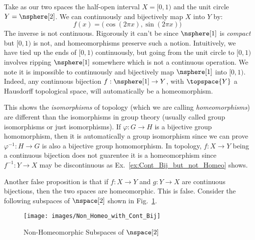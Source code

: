         \begin{example}
            \label{ex:Cont_Bij_but_not_Homeo}%
            Take as our two spaces the half-open interval $X=[0,1)$ and
            the unit circle $Y=\nsphere[2]$. We can continuously and
            bijectively map $X$ into $Y$ by:
            \begin{equation}
                f(x)=\big(\cos(2\pi{x}),\sin(2\pi{x})\big)
            \end{equation}
            The inverse is not continuous. Rigorously it can't be
            since $\nsphere[1]$ is \textit{compact} but $[0,1)$ is not,
            and homeomorphisms preserve such a notion. Intuitively, we
            have tied up the ends of $[0,1)$ continuously, but going
            from the unit circle to $[0,1)$ involves ripping $\nsphere[1]$
            somewhere which is not a continuous operation. We note it
            is impossible to continuously and bijectively map $\nsphere[1]$
            into $[0,1)$. Indeed, any continuous bijection
            $f:\nsphere[1]\rightarrow{Y}$, with $\topspace{Y}$ a
            Hausdorff topological space, will automatically be a
            homeomorphism.
        \end{example}
        This shows the \textit{isomorphisms} of topology (which we are
        calling \textit{homeomorphisms}) are different than the
        isomorphisms in group theory (usually called group isomorphisms
        or just isomorphisms). If $\varphi:G\rightarrow{H}$ is a bijective
        group homomorphism, then it is automatically a group isomorphism
        since we can prove $\varphi^{\minus{1}}:H\rightarrow{G}$ is also
        a bijective group homomorphism. In topology, $f:X\rightarrow{Y}$
        being a continuous bijection does not guarentee it is a
        homeomorphism since $f^{\minus{1}}:Y\rightarrow{X}$ may be
        discontinuous as Ex.~\ref{ex:Cont_Bij_but_not_Homeo} shows.
        \par\hfill\par
        Another false proposition is that if $f:X\rightarrow{Y}$ and
        $g:Y\rightarrow{X}$ are continuous bijections, then the two spaces
        are homeomorphic. This is false. Consider the following subspaces
        of $\nspace[2]$ shown in Fig.~\ref{fig:Non_Homeomorphic_Subspace}.
        \begin{figure}[H]
            \centering
            \captionsetup{type=figure}
            \texttt{[image: images/Non\_Homeo\_with\_Cont\_Bij]}
            \caption{Non-Homeomorphic Subspaces of $\nspace[2]$}
            \label{fig:Non_Homeomorphic_Subspace}
        \end{figure}
